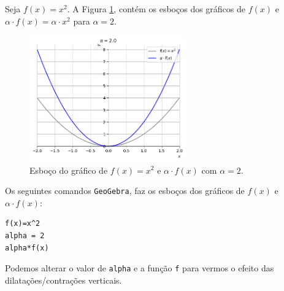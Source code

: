 \documentclass[../main.tex]{subfiles}
\begin{document}
\begin{ex}
  Seja $f(x) = x^2$. A Figura \ref{fig:ex_dilavert}, contém os esboços dos gráficos de $f(x)$ e $\alpha\cdot f(x) = \alpha \cdot x^2$ para $\alpha = 2$.

  \begin{figure}[H]
    \centering
    \includegraphics[width=0.6\textwidth]{fig_func/fig_ex_dilavert}
    \caption{Esboço do gráfico de $f(x) = x^2$ e $\alpha\cdot f(x)$ com $\alpha=2$.}
    \label{fig:ex_dilavert}
  \end{figure}

  
  Os seguintes comandos \verb+GeoGebra+, faz os esboços dos gráficos de $f(x)$ e $\alpha\cdot f(x)$:
\begin{verbatim}
f(x)=x^2
alpha = 2
alpha*f(x)
\end{verbatim}
  Podemos alterar o valor de \verb+alpha+ e a função \verb+f+ para vermos o efeito das dilatações/contrações verticais.
  \end{ex}
\end{document}
